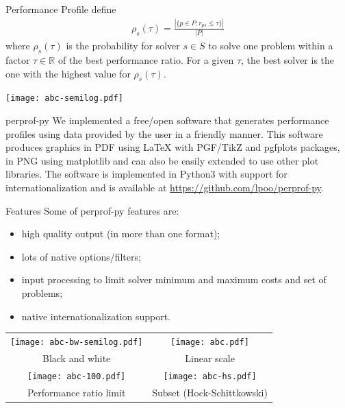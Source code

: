 \documentclass[a0paper,portrait]{baposter}
\begin{document}
\begin{poster}
\begin{posterbox}[column=0,below=auto]{Performance Profile}
    \textcite{Dolan2002} define
    \begin{align*}
      \rho_s(\tau) = \frac{| \{p \in P: r_{ps} \leq \tau\} |}{| P |}
    \end{align*}
    where $\rho_s(\tau)$ is the probability for solver $s \in S$ to solve one
    problem within a factor $\tau \in \mathbb{R}$ of the best performance
    ratio. For a given $\tau$, the best solver is the one with the highest
    value for $\rho_s(\tau)$.

    \texttt{[image: abc-semilog.pdf]}
  \end{posterbox}

  \begin{posterbox}[column=0,below=auto,name=perprof]{perprof-py}
    We implemented a free/open software that generates performance profiles using data
    provided by the user in a friendly manner. This software produces graphics in PDF
    using LaTeX with PGF/TikZ and pgfplots packages,
    in PNG using matplotlib and can also be easily extended to
    use other plot libraries. The software is implemented in Python3 with
    support for internationalization and is available at
    \url{https://github.com/lpoo/perprof-py}.
  \end{posterbox}

  \begin{posterbox}[column=1]{Features}
    Some of perprof-py features are:
    \begin{itemize}[noitemsep]
      \item high quality output (in more than one format);
      \item lots of native options/filters;
      \item input processing to limit solver minimum and maximum costs and set
        of problems;
      \item native internationalization support.
    \end{itemize}

    \begin{center}
      \begin{tabular}{cc}
        \texttt{[image: abc-bw-semilog.pdf]} &
        \texttt{[image: abc.pdf]} \\
        Black and white & Linear scale \\
        \texttt{[image: abc-100.pdf]} &
        \texttt{[image: abc-hs.pdf]} \\
        Performance ratio limit & Subset (Hock-Schittkowski)
      \end{tabular}
    \end{center}


\end{posterbox}
\end{poster}
\end{document}
